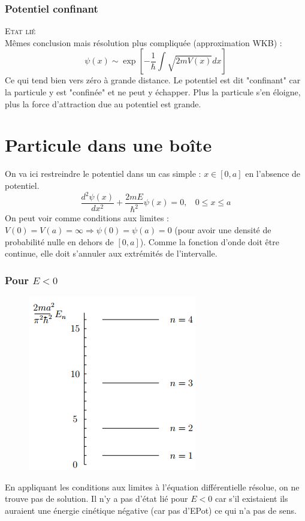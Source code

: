 \documentclass	[11pt, a4paper, openany]{book}
\begin{document}
\subsubsection*{Potentiel confinant}
\textsc{Etat lié}\\
Mêmes conclusion mais résolution plus compliquée (approximation WKB) :
\begin{equation}
\psi(x) \sim \exp\left[ -\frac{1}{\hbar}\int\sqrt{2mV(x)}dx\right]
\end{equation}
Ce qui tend bien vers zéro à grande distance. Le potentiel est dit "confinant" car la particule y est "confinée" et ne peut y échapper. Plus la particule s'en éloigne, plus la force d'attraction due au potentiel est grande.

\section{Particule dans une boîte}
On va ici restreindre le potentiel dans un cas simple : $x \in [0,a]$ en l'absence de potentiel.
\begin{equation}
\frac{d^2\psi(x)}{dx^2} + \frac{2mE}{\hbar^2}\psi(x) = 0, \ \ \ \ 0\leq x \leq a
\end{equation}
On peut voir comme conditions aux limites : $V(0) = V(a) = \infty \Rightarrow \psi(0) = \psi(a) = 0$ (pour avoir une densité de probabilité nulle en dehors de $[0,a]$). Comme la fonction d'onde doit être continue, elle doit s'annuler aux extrémités de l'intervalle.

\subsubsection*{Pour $E < 0$}
\begin{figure}
\includegraphics[scale=0.5]{img/image4.png}
\end{figure}
En appliquant les conditions aux limites à l'équation différentielle résolue, on ne trouve pas de solution. Il n'y a pas d'état lié pour $E < 0$ car s'il existaient ils auraient une énergie cinétique négative (car pas d'EPot) ce qui n'a pas de sens.
\end{document}
